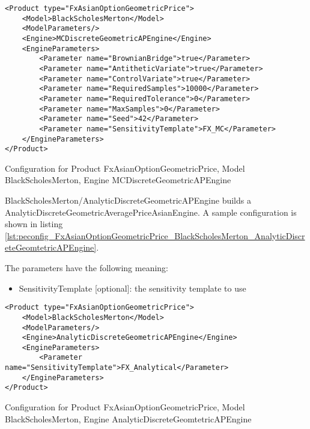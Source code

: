 \begin{longlisting}
\begin{verbatim}
<Product type="FxAsianOptionGeometricPrice">
    <Model>BlackScholesMerton</Model>
    <ModelParameters/>
    <Engine>MCDiscreteGeometricAPEngine</Engine>
    <EngineParameters>
        <Parameter name="BrownianBridge">true</Parameter>    
        <Parameter name="AntitheticVariate">true</Parameter>    
        <Parameter name="ControlVariate">true</Parameter>    
        <Parameter name="RequiredSamples">10000</Parameter>    
        <Parameter name="RequiredTolerance">0</Parameter>    
        <Parameter name="MaxSamples">0</Parameter>    
        <Parameter name="Seed">42</Parameter>    
        <Parameter name="SensitivityTemplate">FX_MC</Parameter>
    </EngineParameters>
</Product>
\end{verbatim}
\caption{Configuration for Product FxAsianOptionGeometricPrice, Model BlackScholesMerton, Engine MCDiscreteGeometricAPEngine}
\label{lst:peconfig_FxAsianOptionGeometricPrice_BlackScholesMerton_MCDiscreteGeomtetricAPEngine}
\end{longlisting}

BlackScholesMerton/AnalyticDiscreteGeometricAPEngine builds a AnalyticDiscreteGeometricAveragePriceAsianEngine. A sample
configuration is shown in listing
\ref{lst:peconfig_FxAsianOptionGeometricPrice_BlackScholesMerton_AnalyticDiscreteGeomtetricAPEngine}.

The parameters have the following meaning:

\begin{itemize}
\item SensitivityTemplate [optional]: the sensitivity template to use 
\end{itemize}

\begin{longlisting}
\begin{verbatim}
<Product type="FxAsianOptionGeometricPrice">
    <Model>BlackScholesMerton</Model>
    <ModelParameters/>
    <Engine>AnalyticDiscreteGeometricAPEngine</Engine>
    <EngineParameters>
        <Parameter name="SensitivityTemplate">FX_Analytical</Parameter>
    </EngineParameters>
</Product>
\end{verbatim}
\caption{Configuration for Product FxAsianOptionGeometricPrice, Model BlackScholesMerton, Engine AnalyticDiscreteGeomtetricAPEngine}
\label{lst:peconfig_FxAsianOptionGeometricPrice_BlackScholesMerton_AnalyticDiscreteGeomtetricAPEngine}
\end{longlisting}

